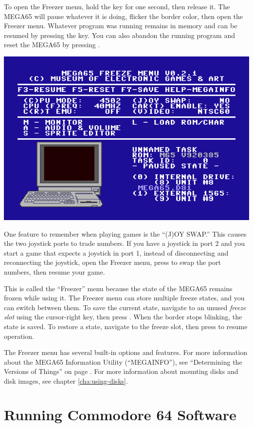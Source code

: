 To open the Freezer menu, hold the  key for one second, then release it. The MEGA65 will pause whatever it is doing, flicker the border color, then open the Freezer menu. Whatever program was running remains in memory and can be resumed by pressing the  key. You can also abandon the running program and reset the MEGA65 by pressing .

\begin{center}
  \includegraphics[width=0.7\linewidth]{images/freezer.png}
\end{center}

One feature to remember when playing games is the ``(J)OY SWAP.'' This causes the two joystick ports to trade numbers. If you have a joystick in port 2 and you start a game that expects a joystick in port 1, instead of disconnecting and reconnecting the joystick, open the Freezer menu, press  to swap the port numbers, then resume your game.

This is called the ``Freezer'' menu because the state of the MEGA65 remains frozen while using it. The Freezer menu can store multiple freeze states, and you can switch between them. To save the current state, navigate to an unused {\it freeze slot} using the cursor-right key, then press . When the border stops blinking, the state is saved. To restore a state, navigate to the freeze slot, then press  to resume operation.

The Freezer menu has several built-in options and features. For more information about the MEGA65 Information Utility (``MEGAINFO''), see ``Determining the Versions of Things'' on page \pageref{sec:versions}. For more information about mounting disks and disk images, see chapter \vref{cha:using-disks}.


\section{Running Commodore 64 Software}

